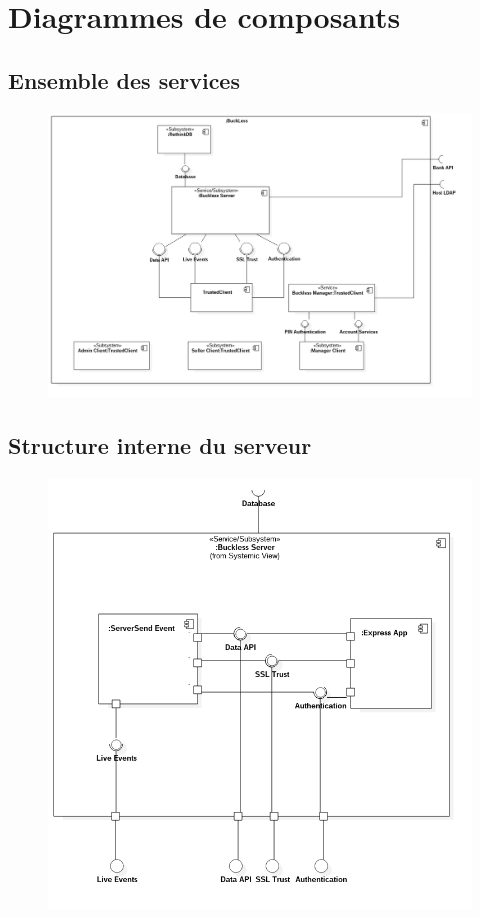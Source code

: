 \section{Diagrammes de composants}
\subsection{Ensemble des services}
    \begin{figure}[h]
        \centering
        \includegraphics[scale=0.45]{./assets/UML/system.png}
        \label{system}
    \end{figure}

\newpage
\subsection{Structure interne du serveur}
    \begin{figure}[h]
        \centering
        \includegraphics[scale=0.55]{./assets/UML/buckless_server.png}
        \label{buckless_server}
    \end{figure}

